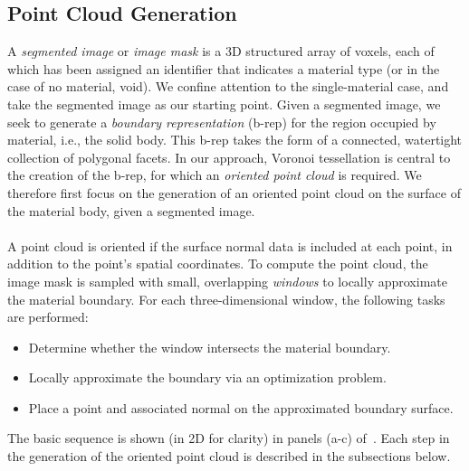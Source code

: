 \subsection{Point Cloud Generation}
\label{Point Cloud Generation}

A \textit{segmented image} or \textit{image mask} is a 3D structured array of voxels, each of which has been assigned an identifier
that indicates a material type (or in the case of no material, void). We confine attention to the single-material case, and take the segmented image as our starting point.  Given a segmented image, we seek to generate a {\em boundary representation} (b-rep) for the region occupied by material, i.e., the solid body.  This b-rep takes the form of a connected, watertight collection of polygonal facets.  In our approach, Voronoi tessellation is central to the creation of the b-rep, for which an {\em oriented point cloud} is required.  We therefore first focus on the generation of an oriented point cloud on the surface of the material body, given a segmented image. \\ \\
%
A point cloud is oriented if the surface normal data is included at each point, in addition to the point's spatial coordinates. To compute the point cloud, the image mask is sampled with small, overlapping \textit{windows} to locally approximate the material boundary. For each three-dimensional window, the following tasks are performed:
\vspace{3mm}
\begin{itemize}[noitemsep]
  \item Determine whether the window intersects the material boundary.
  \item Locally approximate the boundary via an optimization problem. 
  \item Place a point and associated normal on the approximated boundary surface.
\end{itemize}
\vspace{3mm}
The basic sequence is shown (in 2D for clarity) in panels (a-c) of~. Each step in the generation of the oriented point cloud is described in the subsections below.

